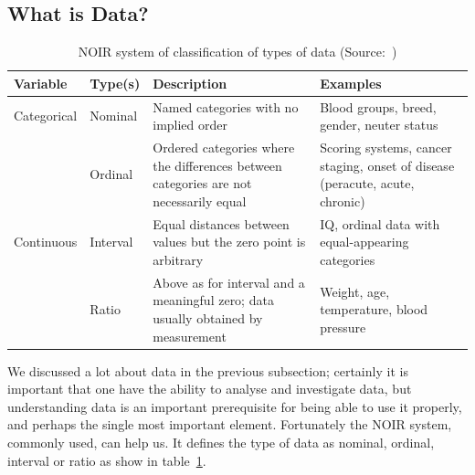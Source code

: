 \subsection{What is Data?}
\begin{table}[h]
    \begin{tabularx}{\textwidth}{ 
    | >{\raggedright\arraybackslash} m{1.8cm} 
    | >{\raggedright\arraybackslash} m{1.8cm}
    | >{\raggedright\arraybackslash} X 
    | >{\raggedright\arraybackslash} X | }
    \toprule
    \hfil\bfseries Variable & \hfil\bfseries Type(s) & \hfil\bfseries Description & \hfil\bfseries Examples \\ 
    \midrule
    Categorical & Nominal & Named categories with no implied order & Blood groups, breed, gender, neuter status \\
    ~ & Ordinal & Ordered categories where the differences between categories are not necessarily equal & Scoring systems, cancer staging, onset of disease (peracute, acute, chronic) \\ 
    \midrule
    Continuous & Interval & Equal distances between values but the zero point is arbitrary & IQ, ordinal data with equal-appearing categories\\
    ~ & Ratio & Above as for interval and a meaningful zero; data usually obtained by measurement & Weight, age, temperature, blood pressure \\
    \bottomrule
    \end{tabularx}
\caption{NOIR system of classification of types of data (Source:~\cite{Article:intro_to_data_analysis})}
\label{table:noir_sys}     
\end{table}
We discussed a lot about data in the previous subsection; certainly it is important that one have the ability to analyse and investigate data, but 
understanding data is an important prerequisite for being able to use it properly, and perhaps the single most important element.
Fortunately the NOIR system, commonly used, can help us. It defines the type of data as nominal, ordinal, interval or ratio as show in table~\ref{table:noir_sys}.

